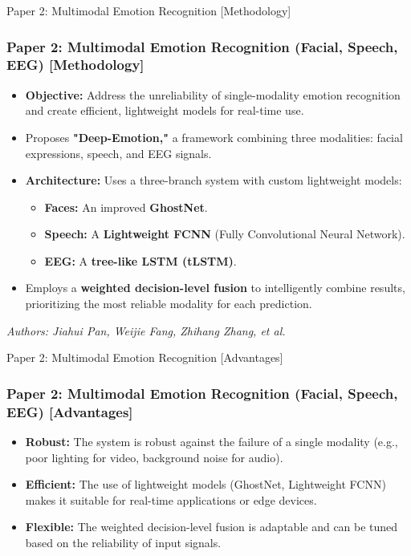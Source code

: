 \documentclass[11pt]{beamer}
\begin{document}
\begin{frame}{Paper 2: Multimodal Emotion Recognition [Methodology]}
\frametitle{Paper 2: Multimodal Emotion Recognition (Facial, Speech, EEG) [Methodology]}
\begin{itemize}
    \item \textbf{Objective:} Address the unreliability of single-modality emotion recognition and create efficient, lightweight models for real-time use.
    \item Proposes \textbf{"Deep-Emotion,"} a framework combining three modalities: facial expressions, speech, and EEG signals.
    \item \textbf{Architecture:} Uses a three-branch system with custom lightweight models:
    \begin{itemize}
        \item \textbf{Faces:} An improved \textbf{GhostNet}.
        \item \textbf{Speech:} A \textbf{Lightweight FCNN} (Fully Convolutional Neural Network).
        \item \textbf{EEG:} A \textbf{tree-like LSTM (tLSTM)}.
    \end{itemize}
    \item Employs a \textbf{weighted decision-level fusion} to intelligently combine results, prioritizing the most reliable modality for each prediction.
\end{itemize}
\vfill
\small{\textit{Authors: Jiahui Pan, Weijie Fang, Zhihang Zhang, et al.}}
\end{frame}

\begin{frame}{Paper 2: Multimodal Emotion Recognition [Advantages]}
\frametitle{Paper 2: Multimodal Emotion Recognition (Facial, Speech, EEG) [Advantages]}
\begin{itemize}
    \item \textbf{Robust:} The system is robust against the failure of a single modality (e.g., poor lighting for video, background noise for audio).
    \item \textbf{Efficient:} The use of lightweight models (GhostNet, Lightweight FCNN) makes it suitable for real-time applications or edge devices.
    \item \textbf{Flexible:} The weighted decision-level fusion is adaptable and can be tuned based on the reliability of input signals.
\end{itemize}
\end{frame}
\end{document}
